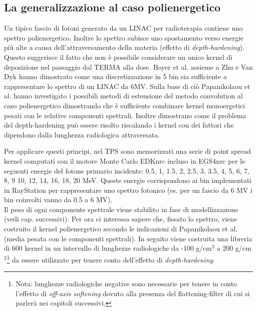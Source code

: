 {\subsection{La generalizzazione al caso polienergetico}
Un tipico fascio di fotoni generato da un LINAC per radioterapia contiene uno spettro polienergetico. Inoltre lo spettro subisce uno spostamento verso energie più alte a causa dell'attraversamento della materia (effetto di \textit{depth-hardening}). Questo suggerisce il fatto che non è possibile considerare un unico kernel di deposizione nel passaggio dal TERMA alla dose. Boyer et al. assieme a Zhu e Van Dyk \cite{Boyer1989,Zhu1995} hanno dimostrato come una discretizzazione in 5 bin sia sufficiente a rappresentare lo spettro di un LINAC da 6MV. Sulla base di ciò Papanikolaou et al. \cite{Papanikolaou1993} hanno investigato i possibili metodi di estensione del metodo convolution al caso polienergetico dimostrando che è sufficiente combinare kernel monoergetici pesati con le relative componenti spettrali. Inoltre dimostrano come il problema del depth-hardening può essere risolto riscalando i kernel con dei fattori che dipendono dalla lunghezza radiologica attraversata.

Per applicare questi principi, nel TPS sono memorizzati una serie di point spread kernel computati con il motore Monte Carlo EDKnrc incluso in EGS4nrc per le seguenti energie del fotone primario incidente: 0.5, 1, 1.5, 2, 2.5, 3, 3.5, 4, 5, 6, 7, 8, 9 10, 12, 14, 16, 18, 20 MeV. Queste energie corrispondono ai bin implementati in RayStation per rappresentare uno spettro fotonico (es. per un fascio da 6 MV i bin coinvolti vanno da 0.5 a 6 MV).\\
Il peso di ogni componente spettrale viene stabilito in fase di modellizzazione (vedi cap. successivi). Per ora ci interessa sapere che, fissato lo spettro, viene costruito il kernel polienergetico secondo le indicazioni di Papanikolaou et al. \cite{Papanikolaou1993} (media pesata con le componenti spettrali). In seguito viene costruita una libreria di 600 kernel in un intervallo di lunghezze radiologiche da -100 g/cm$^2$ a 200 g/cm$^2$\footnote{Nota: lunghezze radiologiche negative sono necessarie per tenere in conto l'effetto di \textit{off-axis softening} dovuto alla presenza del flattening-filter di cui si parlerà nei capitoli successivi.} da essere utilizzate per tenere conto dell'effetto di \textit{depth-hardening}.


}
